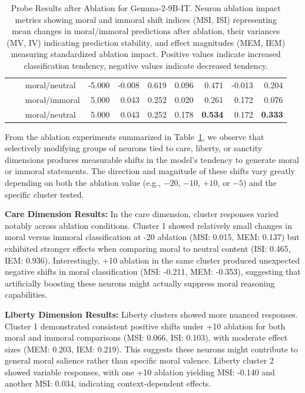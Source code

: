\documentclass[runninghheads]{llncs}
\begin{document}
\begin{table}[!ht]
\begin{tabular}{|l|l|l|r|r|r|r|r|r|r|}
         &  & moral/neutral & -5.000 & -0.008 & 0.619 & 0.096 & 0.471 & -0.013 & 0.204 \\ 
         &  & moral/immoral & 5.000 & 0.043 & 0.252 & 0.020 & 0.261 & 0.172 & 0.076 \\ 
         &  & moral/neutral & 5.000 & 0.043 & 0.252 & 0.178 & \textbf{0.534} & 0.172 & \textbf{0.333} \\ 
         \hline
    \end{tabular}
    \endgroup
        \caption{Probe Results after Ablation for Gemma-2-9B-IT. Neuron ablation impact metrics showing moral and immoral shift indices (MSI, ISI) representing mean changes in moral/immoral predictions after ablation, their variances (MV, IV) indicating prediction stability, and effect magnitudes (MEM, IEM) measuring standardized ablation impact. Positive values indicate increased classification tendency, negative values indicate decreased tendency.}
    \label{tab:probe_results}    
\end{table}




From the ablation experiments summarized in Table~\ref{tab:probe_results}, we observe that selectively modifying groups of neurons tied to care, liberty, or sanctity dimensions produces measurable shifts in the model's tendency to generate moral or immoral statements. The direction and magnitude of these shifts vary greatly depending on both the ablation value (e.g., $-20$, $-10$, $+10$, or $-5$) and the specific cluster tested.

\textbf{Care Dimension Results:} In the care dimension, cluster responses varied notably across ablation conditions. Cluster 1 showed relatively small changes in moral versus immoral classification at -20 ablation (MSI: 0.015, MEM: 0.137) but exhibited stronger effects when comparing moral to neutral content (ISI: 0.465, IEM: 0.936). Interestingly, +10 ablation in the same cluster produced unexpected negative shifts in moral classification (MSI: -0.211, MEM: -0.353), suggesting that artificially boosting these neurons might actually suppress moral reasoning capabilities.

\textbf{Liberty Dimension Results:} Liberty clusters showed more nuanced responses. Cluster 1 demonstrated consistent positive shifts under +10 ablation for both moral and immoral comparisons (MSI: 0.066, ISI: 0.103), with moderate effect sizes (MEM: 0.203, IEM: 0.219). This suggests these neurons might contribute to general moral salience rather than specific moral valence. Liberty cluster 2 showed variable responses, with one +10 ablation yielding MSI: -0.140 and another MSI: 0.034, indicating context-dependent effects.
\end{document}
